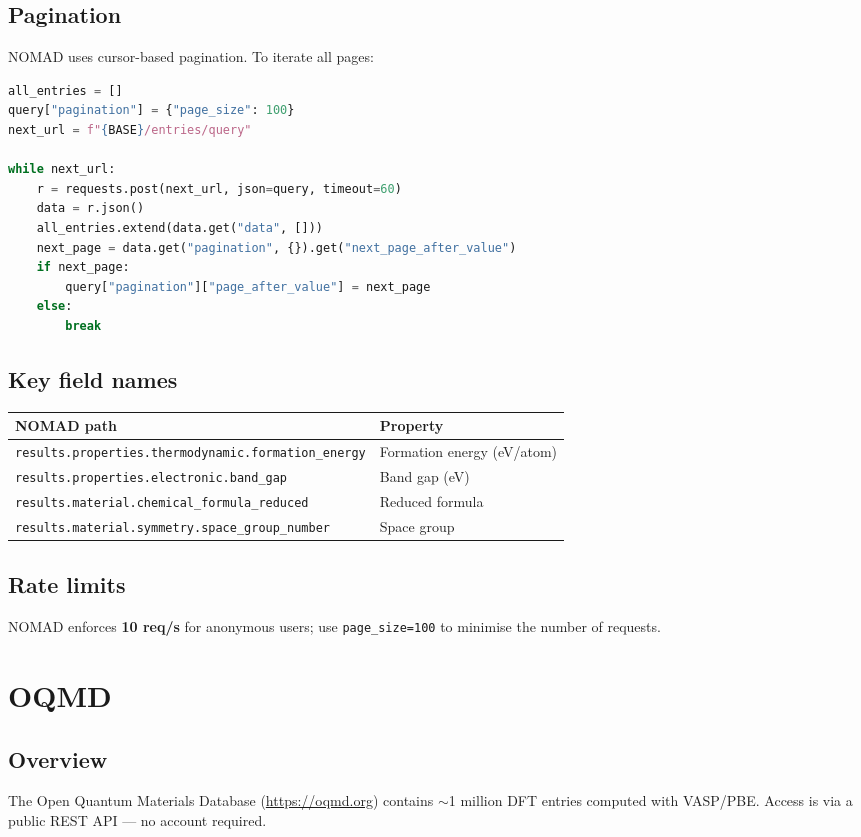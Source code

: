 \documentclass[11pt,a4paper]{article}
\begin{document}
\subsection{Pagination}
NOMAD uses cursor-based pagination. To iterate all pages:
\begin{lstlisting}[language=Python]
all_entries = []
query["pagination"] = {"page_size": 100}
next_url = f"{BASE}/entries/query"

while next_url:
    r = requests.post(next_url, json=query, timeout=60)
    data = r.json()
    all_entries.extend(data.get("data", []))
    next_page = data.get("pagination", {}).get("next_page_after_value")
    if next_page:
        query["pagination"]["page_after_value"] = next_page
    else:
        break
\end{lstlisting}

\subsection{Key field names}
\begin{center}
\begin{tabular}{ll}
\toprule
NOMAD path & Property \\
\midrule
\texttt{results.properties.thermodynamic.formation\_energy} & Formation energy (eV/atom) \\
\texttt{results.properties.electronic.band\_gap}            & Band gap (eV) \\
\texttt{results.material.chemical\_formula\_reduced}        & Reduced formula \\
\texttt{results.material.symmetry.space\_group\_number}     & Space group \\
\bottomrule
\end{tabular}
\end{center}

\subsection{Rate limits}
NOMAD enforces \textbf{10 req/s} for anonymous users; use \verb|page_size=100| to
minimise the number of requests.

\section{OQMD}

\subsection{Overview}
The Open Quantum Materials Database (\url{https://oqmd.org}) contains $\sim$1 million
DFT entries computed with VASP/PBE.
Access is via a public REST API --- no account required.
\end{document}
